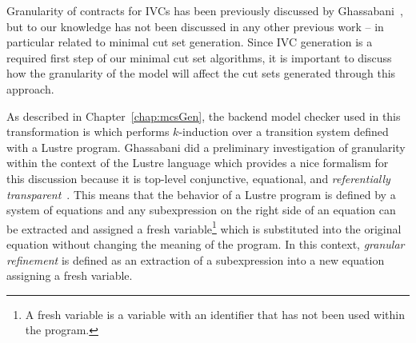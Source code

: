 Granularity of contracts for IVCs has been previously discussed by Ghassabani~\cite{ghassabani_2018}, but to our knowledge has not been discussed in any other previous work -- in particular related to minimal cut set generation. Since IVC generation is a required first step of our minimal cut set algorithms, it is important to discuss how the granularity of the model will affect the cut sets generated through this approach. 

As described in Chapter~\ref{chap:mcsGen}, the backend model checker used in this transformation is \jkind which performs $k$-induction over a transition system defined with a Lustre program. Ghassabani did a preliminary investigation of granularity within the context of the Lustre language which provides a nice formalism for this discussion because it is top-level conjunctive, equational, and \textit{referentially transparent}~\cite{Halbwachs91:IEEE}. This means that the behavior of a Lustre program is defined by a system of equations and any subexpression on the right side of an equation can be extracted and assigned a fresh variable\footnote{A fresh variable is a variable with an identifier that has not been used within the program.} which is substituted into the original equation without changing the meaning of the program. In this context, \textit{granular refinement} is defined as an extraction of a subexpression into a new equation assigning a fresh variable. 



